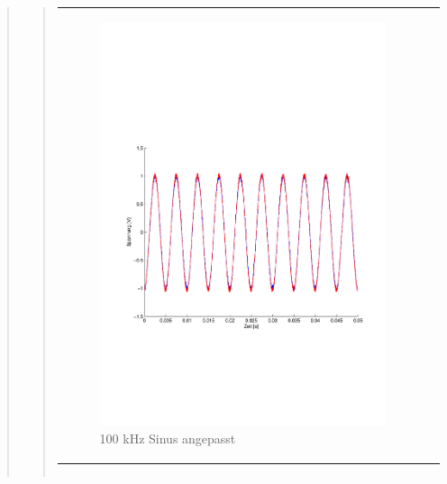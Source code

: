 \begin{quote}
\begin{quote}
\begin{center}
\begin{tabular}{ll}
                \begin{minipage}{0.6\textwidth}
                    \begin{figure}[H]
                        \includegraphics[scale=0.5, trim = 16mm 70mm 16mm 85mm, clip]
                                        {Bilder/100kHz_sin_Signal_Rekonstuiert_delayed}
                       \caption{100 kHz Sinus angepasst}
                      \label{fig:100kHz_sin_rek_angepasst}
                    \end{figure}
                \end{minipage}
            
            \end{tabular}
        \end{center}
        
        
        
        
        \begin{center}
            \begin{tabular}{ll}
            

\end{tabular}
\end{center}
\end{quote}
\end{quote}
